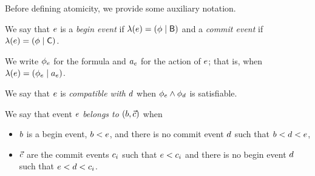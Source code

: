 Before defining atomicity, we provide some auxiliary notation.

We say that $e$ is a \emph{begin event} if
$\lambda(e)=(\phi\mid\mathsf{B})$ and a \emph{commit event} if
$\lambda(e)=(\phi\mid\mathsf{C})$.

We write $\phi_e$ for the formula and $a_e$ for the
action of $e$; that is, when $\lambda(e)=(\phi_e\mid a_e)$.

We say that $e$ is \emph{compatible with} $d$ when
$\phi_e\land\phi_d$ is satisfiable.

We say that  event $e$ \emph{belongs to} $(b,\vec{c})$ when
\begin{itemize}
\item $b$ is a begin event, $b<e$, and
  there is no commit event $d$ such that $b<d<e$,
\item $\vec{c}$ are the commit events $c_i$ such that $e<c_i$ and
  there is no begin event $d$ such that $e<d<c_i$.
\end{itemize}


